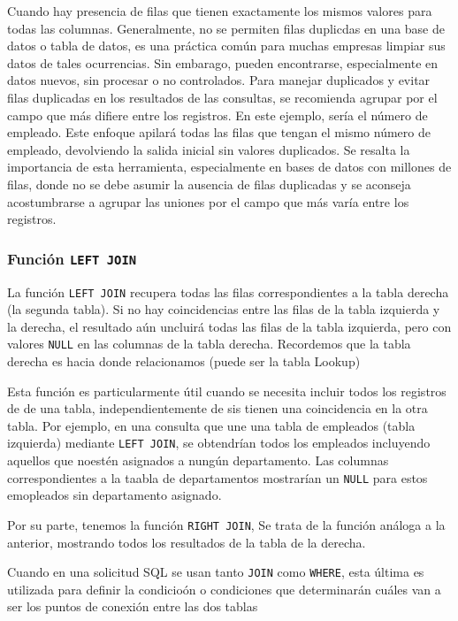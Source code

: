         Cuando hay presencia de filas que tienen exactamente los mismos valores para todas las columnas. Generalmente, no se permiten filas duplicdas en una base de datos o tabla de datos,  es una práctica común para muchas empresas limpiar sus datos de tales ocurrencias. Sin embarago, pueden encontrarse, especialmente en datos nuevos, sin procesar o no controlados. Para manejar duplicados y evitar filas duplicadas en los resultados de las consultas, se recomienda agrupar por el campo que más difiere entre los registros. En este ejemplo, sería el número de empleado. Este enfoque apilará todas las filas que tengan el mismo número de empleado, devolviendo la salida inicial sin valores duplicados. Se resalta la importancia de esta herramienta, especialmente en bases de datos con millones de filas, donde no se debe asumir la ausencia de filas duplicadas y se aconseja acostumbrarse a agrupar las uniones por el campo que más varía entre los registros.

        \subsubsection{Función \texttt{LEFT JOIN}}

        La función \texttt{LEFT JOIN} recupera todas las filas correspondientes a la tabla derecha (la segunda tabla). Si no hay coincidencias entre las filas de la tabla izquierda y la derecha, el resultado aún uncluirá todas las filas de la tabla izquierda, pero con valores \texttt{NULL} en las columnas de la tabla derecha. Recordemos que la tabla derecha es hacia donde relacionamos (puede ser la tabla Lookup) 

        Esta función es particularmente útil cuando se necesita incluir todos los registros de de una tabla, independientemente de sis tienen una coincidencia en la otra tabla. Por ejemplo, en una consulta que une una tabla de empleados (tabla izquierda) mediante \texttt{LEFT JOIN}, se obtendrían todos los empleados incluyendo aquellos que noestén asignados a nungún departamento. Las columnas correspondientes a la taabla de departamentos mostrarían un \texttt{NULL} para  estos emopleados sin departamento asignado.

        Por su parte, tenemos la función \texttt{RIGHT JOIN}, Se trata de la función análoga a la anterior, mostrando todos los resultados de la tabla de la derecha.
        
        
        Cuando en una solicitud SQL se usan tanto \texttt{JOIN} como \texttt{WHERE}, esta última es utilizada para definir la condicioón o condiciones que determinarán cuáles van a ser los puntos de conexión entre las dos tablas

